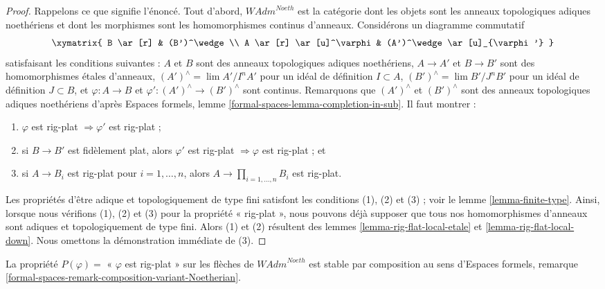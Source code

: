 \begin{proof}
Rappelons ce que signifie l'énoncé. Tout d'abord, 
$\textit{WAdm}^{Noeth}$ est la catégorie dont les objets sont les
anneaux topologiques adiques noethériens et dont les morphismes sont les
homomorphismes continus d'anneaux. Considérons un diagramme commutatif
$$
\xymatrix{
B \ar[r] & (B')^\wedge \\
A \ar[r] \ar[u]^\varphi & (A')^\wedge \ar[u]_{\varphi'}
}
$$
satisfaisant les conditions suivantes :
$A$ et $B$ sont des anneaux topologiques adiques noethériens,
$A \to A'$ et $B \to B'$ sont des homomorphismes étales d'anneaux,
$(A')^\wedge = \lim A'/I^nA'$ pour un idéal de définition $I \subset A$,
$(B')^\wedge = \lim B'/J^nB'$ pour un idéal de définition $J \subset B$, et
$\varphi : A \to B$ et $\varphi' : (A')^\wedge \to (B')^\wedge$
sont continus. Remarquons que $(A')^\wedge$ et $(B')^\wedge$ sont des
anneaux topologiques adiques noethériens d'après
Espaces formels, lemme \ref{formal-spaces-lemma-completion-in-sub}.
Il faut montrer :
\begin{enumerate}
\item $\varphi$ est rig-plat $\Rightarrow \varphi'$ est rig-plat ;
\item si $B \to B'$ est fidèlement plat, alors $\varphi'$ est rig-plat
$\Rightarrow \varphi$ est rig-plat ; et
\item si $A \to B_i$ est rig-plat pour $i = 1, \ldots, n$, alors
$A \to \prod_{i = 1, \ldots, n} B_i$ est rig-plat.
\end{enumerate}
Les propriétés d'être adique et topologiquement de type fini satisfont
les conditions (1), (2) et (3) ; voir le lemme \ref{lemma-finite-type}.
Ainsi, lorsque nous vérifions (1), (2) et (3) pour la propriété
« rig-plat », nous pouvons déjà supposer que tous nos homomorphismes d'anneaux
sont adiques et topologiquement de type fini. Alors (1) et (2) résultent
des lemmes \ref{lemma-rig-flat-local-etale} et
\ref{lemma-rig-flat-local-down}.
Nous omettons la démonstration immédiate de (3).
\end{proof}

\begin{lemma}
\label{lemma-composition-rig-flat-continuous}
La propriété $P(\varphi)=$ « $\varphi$ est rig-plat »
sur les flèches de $\textit{WAdm}^{Noeth}$ est stable par composition
au sens d'Espaces formels, remarque
\ref{formal-spaces-remark-composition-variant-Noetherian}.
\end{lemma}

